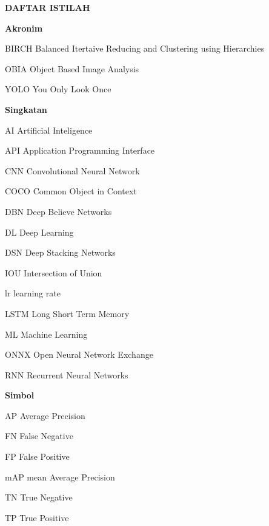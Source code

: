 \newpage
{}
\singlespacing

\begin{center}
	\begin{large}\textbf{DAFTAR ISTILAH}\end{large}
\end{center}
\vspace{1cm}


\noindent \begin{large}\textbf{Akronim}\end{large}
	\begin{abbreviations}
		\item[BIRCH] Balanced Itertaive Reducing and Clustering using Hierarchies
		\item[OBIA] Object Based Image Analysis
		\item[YOLO] You Only Look Once
		
	\end{abbreviations}
	
	
	\vspace{1cm}
	\noindent \begin{large}\textbf{Singkatan}\end{large}
	\begin{abbreviations}
		\item[AI] Artificial Inteligence
		\item[API] Application Programming Interface
		\item[CNN] Convolutional Neural Network
		\item[COCO] Common Object in Context
		\item[DBN] Deep Believe Networks
		\item[DL] Deep Learning
		\item[DSN] Deep Stacking Networks
		\item[IOU] Intersection of Union
		\item[lr] learning rate 
		\item[LSTM] Long Short Term Memory
		\item[ML] Machine Learning
		\item[ONNX] Open Neural Network Exchange
		\item[RNN] Recurrent Neural Networks
	\end{abbreviations}


	\vspace{1cm}
	\noindent \begin{large}\textbf{Simbol}\end{large}
	\begin{abbreviations}
		\item[AP] Average Precision
		\item[FN] False Negative
		\item[FP] False Positive
		\item[mAP] mean Average Precision
		\item[TN] True Negative
		\item[TP] True Positive
		
	\end{abbreviations}